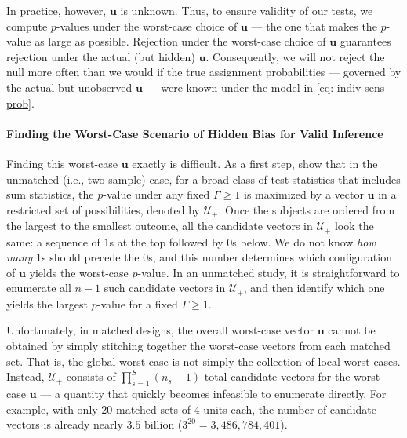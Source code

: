 \documentclass[
  12pt,
  leqno]{article}
\begin{document}
In practice, however, \(\bm{u}\) is unknown. Thus, to ensure validity of
our tests, we compute \(p\)-values under the worst-case choice of
\(\bm{u}\) --- the one that makes the \(p\)-value as large as possible.
Rejection under the worst-case choice of \(\bm{u}\) guarantees rejection
under the actual (but hidden) \(\bm{u}\). Consequently, we will not
reject the null more often than we would if the true assignment
probabilities --- governed by the actual but unobserved \(\bm{u}\) ---
were known under the model in \eqref{eq: indiv sens prob}.

\paragraph{Finding the Worst-Case Scenario of Hidden Bias for Valid
Inference}\label{finding-the-worst-case-scenario-of-hidden-bias-for-valid-inference}

Finding this worst-case \(\bm{u}\) exactly is difficult. As a first
step, \citet{rosenbaumkrieger1990} show that in the unmatched (i.e.,
two-sample) case, for a broad class of test statistics that includes sum
statistics, the \(p\)-value under any fixed \(\Gamma \geq 1\) is
maximized by a vector \(\bm{u}\) in a restricted set of possibilities,
denoted by \(\mathcal{U}_{+}\). Once the subjects are ordered from the
largest to the smallest outcome, all the candidate vectors in
\(\mathcal{U}_{+}\) look the same: a sequence of \(1\)s at the top
followed by \(0\)s below. We do not know \emph{how many} \(1\)s should
precede the \(0\)s, and this number determines which configuration of
\(\bm{u}\) yields the worst-case \(p\)-value. In an unmatched study, it
is straightforward to enumerate all \(n - 1\) such candidate vectors in
\(\mathcal{U}_+\), and then identify which one yields the largest
\(p\)-value for a fixed \(\Gamma \geq 1\).

Unfortunately, in matched designs, the overall worst-case vector
\(\bm{u}\) cannot be obtained by simply stitching together the
worst-case vectors from each matched set. That is, the global worst case
is not simply the collection of local worst cases. Instead,
\(\mathcal{U}_{+}\) consists of \(\prod_{s = 1}^S (n_s - 1)\) total
candidate vectors for the worst-case \(\bm{u}\)
\citep[p.~496]{rosenbaumkrieger1990} --- a quantity that quickly becomes
infeasible to enumerate directly. For example, with only \(20\) matched
sets of \(4\) units each, the number of candidate vectors is already
nearly \(3.5\) billion (\(3^{20} = 3{,}486{,}784{,}401\)).
\end{document}
